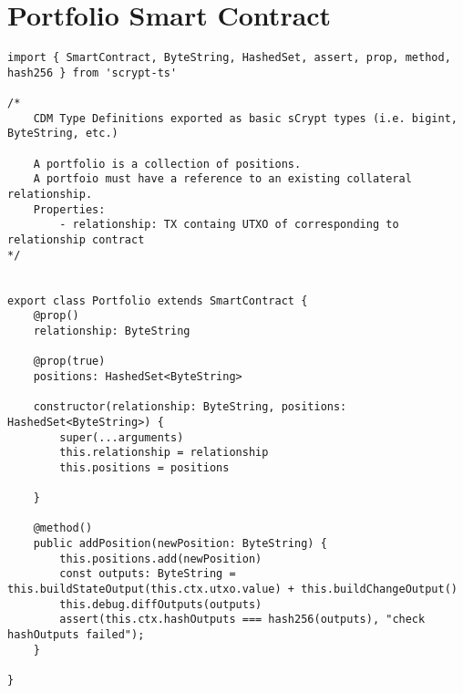 \section{Portfolio Smart Contract}
\label{app:portfolio}

\begin{lstlisting}[style=htmlcssjs, caption=Portfolio Smart Contract]
import { SmartContract, ByteString, HashedSet, assert, prop, method, hash256 } from 'scrypt-ts'

/*
    CDM Type Definitions exported as basic sCrypt types (i.e. bigint, ByteString, etc.)

    A portfolio is a collection of positions.
    A portfoio must have a reference to an existing collateral relationship.
    Properties:
        - relationship: TX containg UTXO of corresponding to relationship contract
*/


export class Portfolio extends SmartContract {
    @prop()
    relationship: ByteString
    
    @prop(true)
    positions: HashedSet<ByteString>

    constructor(relationship: ByteString, positions: HashedSet<ByteString>) {
        super(...arguments)
        this.relationship = relationship
        this.positions = positions

    }

    @method()
    public addPosition(newPosition: ByteString) {
        this.positions.add(newPosition)
        const outputs: ByteString = this.buildStateOutput(this.ctx.utxo.value) + this.buildChangeOutput()
        this.debug.diffOutputs(outputs)
        assert(this.ctx.hashOutputs === hash256(outputs), "check hashOutputs failed");
    }

}

\end{lstlisting}
